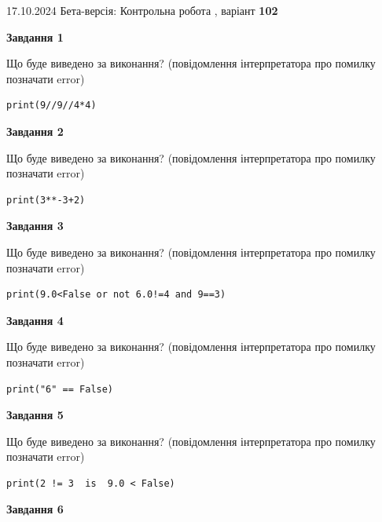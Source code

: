 \documentclass[12pt, ukrainian]{article}
\begin{document}
{\Large{17.10.2024 Бета-версія: Контрольна робота , варіант  \No \textbf { 102 }\par}}
{
\begin {large}
{\begin {center}\textbf{Завдання 1}\end {center}}

Що буде виведено за виконання? (повідомлення інтерпретатора про помилку позначати error)\par
\begin{verbatim}
print(9//9//4*4)
\end{verbatim}

{\begin {center}\textbf{Завдання 2}\end {center}}

Що буде виведено за виконання? (повідомлення інтерпретатора про помилку позначати error)\par
\begin{verbatim}
print(3**-3+2)
\end{verbatim}

{\begin {center}\textbf{Завдання 3}\end {center}}

Що буде виведено за виконання? (повідомлення інтерпретатора про помилку позначати error)\par
\begin{verbatim}
print(9.0<False or not 6.0!=4 and 9==3)
\end{verbatim}

{\begin {center}\textbf{Завдання 4}\end {center}}

Що буде виведено за виконання? (повідомлення інтерпретатора про помилку позначати error)\par
\begin{verbatim}
print("6" == False)
\end{verbatim}

{\begin {center}\textbf{Завдання 5}\end {center}}

Що буде виведено за виконання? (повідомлення інтерпретатора про помилку позначати error)\par
\begin{verbatim}
print(2 != 3  is  9.0 < False)
\end{verbatim}

{\begin {center}\textbf{Завдання 6}\end {center}}


\end{large}}
\end{document}
